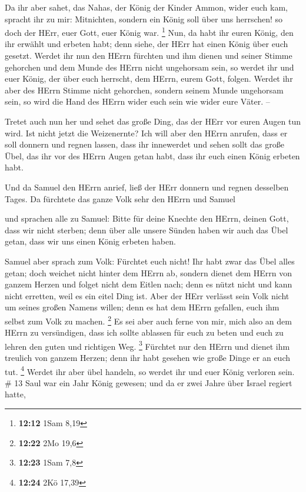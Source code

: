 Da ihr aber sahet, das Nahas, der König der Kinder Ammon,
wider euch kam, spracht ihr zu mir: Mitnichten, sondern ein König soll
über uns herrschen! so doch der HErr, euer Gott, euer König war.
\footnote{\textbf{12:12} 1Sam 8,19}  Nun, da habt ihr euren
König, den ihr erwählt und erbeten habt; denn siehe, der HErr hat einen
König über euch gesetzt.  Werdet ihr nun den HErrn fürchten
und ihm dienen und seiner Stimme gehorchen und dem Munde des HErrn nicht
ungehorsam sein, so werdet ihr und euer König, der über euch herrscht,
dem HErrn, eurem Gott, folgen.  Werdet ihr aber des HErrn
Stimme nicht gehorchen, sondern seinem Munde ungehorsam sein, so wird
die Hand des HErrn wider euch sein wie wider eure Väter. --

 Tretet auch nun her und sehet das große Ding, das der HErr
vor euren Augen tun wird.  Ist nicht jetzt die Weizenernte?
Ich will aber den HErrn anrufen, dass er soll donnern und regnen lassen,
dass ihr innewerdet und sehen sollt das große Übel, das ihr vor des
HErrn Augen getan habt, dass ihr euch einen König erbeten habt.

 Und da Samuel den HErrn anrief, ließ der HErr donnern und
regnen desselben Tages. Da fürchtete das ganze Volk sehr den HErrn und
Samuel

 und sprachen alle zu Samuel: Bitte für deine Knechte den
HErrn, deinen Gott, dass wir nicht sterben; denn über alle unsere Sünden
haben wir auch das Übel getan, dass wir uns einen König erbeten haben.

 Samuel aber sprach zum Volk: Fürchtet euch nicht! Ihr habt
zwar das Übel alles getan; doch weichet nicht hinter dem HErrn ab,
sondern dienet dem HErrn von ganzem Herzen  und folget
nicht dem Eitlen nach; denn es nützt nicht und kann nicht erretten, weil
es ein eitel Ding ist.  Aber der HErr verlässt sein Volk
nicht um seines großen Namens willen; denn es hat dem HErrn gefallen,
euch ihm selbst zum Volk zu machen. \footnote{\textbf{12:22} 2Mo 19,6}
 Es sei aber auch ferne von mir, mich also an dem HErrn zu
versündigen, dass ich sollte ablassen für euch zu beten und euch zu
lehren den guten und richtigen Weg. \footnote{\textbf{12:23} 1Sam 7,8}
 Fürchtet nur den HErrn und dienet ihm treulich von ganzem
Herzen; denn ihr habt gesehen wie große Dinge er an euch tut.
\footnote{\textbf{12:24} 2Kö 17,39}  Werdet ihr aber übel
handeln, so werdet ihr und euer König verloren sein. \# 13 
Saul war ein Jahr König gewesen; und da er zwei Jahre über Israel
regiert hatte,

